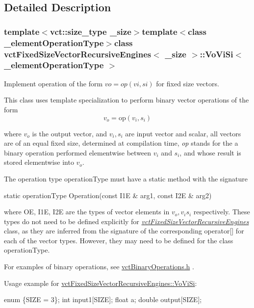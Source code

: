 \subsection{Detailed Description}
\subsubsection*{template$<$vct\+::size\+\_\+type \+\_\+size$>$template$<$class \+\_\+element\+Operation\+Type$>$class vct\+Fixed\+Size\+Vector\+Recursive\+Engines$<$ \+\_\+size $>$\+::\+Vo\+Vi\+Si$<$ \+\_\+element\+Operation\+Type $>$}

Implement operation of the form $vo = op(vi, si)$ for fixed size vectors. 

This class uses template specialization to perform binary vector operations of the form \[ v_o = \mathrm{op}(v_i, s_i) \]

where $v_o$ is the output vector, and $v_i, s_i$ are input vector and scalar, all vectors are of an equal fixed size, determined at compilation time, {\itshape op} stands for the a binary operation performed elementwise between $v_i$ and $s_i$, and whose result is stored elementwise into $v_o$.

The operation type operation\+Type must have a static method with the signature


\begin{DoxyPre}
static operationType Operation(const I1E & arg1, const I2E & arg2)
\end{DoxyPre}


where O\+E, I1\+E, I2\+E are the types of vector elements in $v_o, v_i s_i$ respectively. These types do not need to be defined explicitly for {\itshape \hyperlink{classvct_fixed_size_vector_recursive_engines}{vct\+Fixed\+Size\+Vector\+Recursive\+Engines}} class, as they are inferred from the signature of the corresponding operator\mbox{[}\mbox{]} for each of the vector types. However, they may need to be defined for the class operation\+Type.

For examples of binary operations, see \hyperlink{vct_binary_operations_8h}{vct\+Binary\+Operations.\+h} .

Usage example for \hyperlink{classvct_fixed_size_vector_recursive_engines_1_1_vo_vi_si}{vct\+Fixed\+Size\+Vector\+Recursive\+Engines\+::\+Vo\+Vi\+Si}\+: 
\begin{DoxyPre}
enum \{SIZE = 3\};
int input1[SIZE];
float a;
double output[SIZE];\end{DoxyPre}



